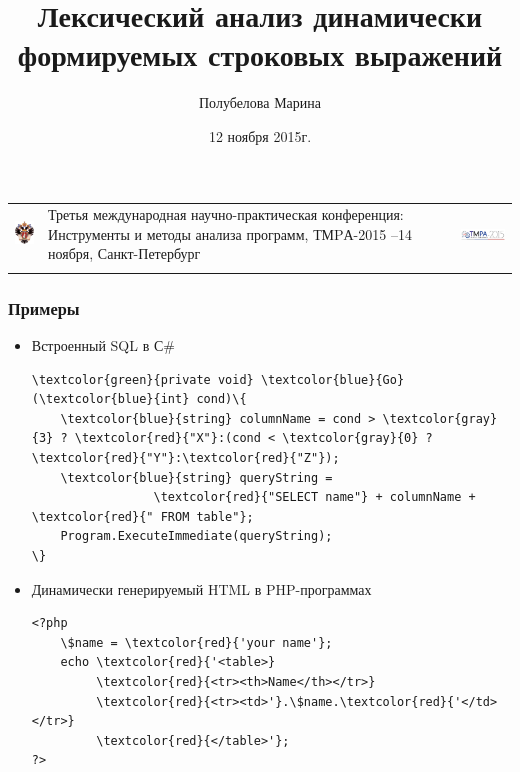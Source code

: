 \documentclass{beamer}
\title[]{Лексический анализ динамически формируемых строковых выражений}
\institute[СПбГУ]{
Санкт-Петербургский государственный университет}
\author[Полубелова Марина]{Полубелова Марина}
\date{12 ноября 2015г.}
\begin{document}
\begin{frame}
    \begin{tabular}[c c c]{m{2cm} m{5.5cm} m{3cm}}
        \begin{center}
        \includegraphics[width=1.3cm]{SPbGU_Logo.png}
    \end{center}
    &
    Третья международная научно-практическая конференция: \newline Инструменты и методы анализа программ, ТМPА-2015
    \newline
    12--14 ноября, Санкт-Петербург
    &
    \begin{center}
        \includegraphics[width=3cm]{tmpa2015_logo.png}
    \end{center}
    \\
    &&
    \end{tabular}
    \titlepage
\end{frame}


\begin{frame}[fragile]
\transwipe[direction=90]
\frametitle{Примеры}
\begin{itemize}

\item Встроенный SQL в С\#
\begin{Verbatim}[commandchars=\\\{\}]
\textcolor{green}{private void} \textcolor{blue}{Go} (\textcolor{blue}{int} cond)\{
	\textcolor{blue}{string} columnName = cond > \textcolor{gray}{3} ? \textcolor{red}{"X"}:(cond < \textcolor{gray}{0} ? \textcolor{red}{"Y"}:\textcolor{red}{"Z"});
	\textcolor{blue}{string} queryString = 
	             \textcolor{red}{"SELECT name"} + columnName + \textcolor{red}{" FROM table"};
	Program.ExecuteImmediate(queryString);
\}
\end{Verbatim}
		
\item Динамически генерируемый HTML в PHP-программах
\begin{Verbatim}[commandchars=\\\{\}]	
<?php 
    \$name = \textcolor{red}{'your name'};
    echo \textcolor{red}{'<table>} 
         \textcolor{red}{<tr><th>Name</th></tr>}  
         \textcolor{red}{<tr><td>'}.\$name.\textcolor{red}{'</td></tr>} 
         \textcolor{red}{</table>'};
?>
\end{Verbatim}
\end{itemize}
\end{frame}
\end{document}
